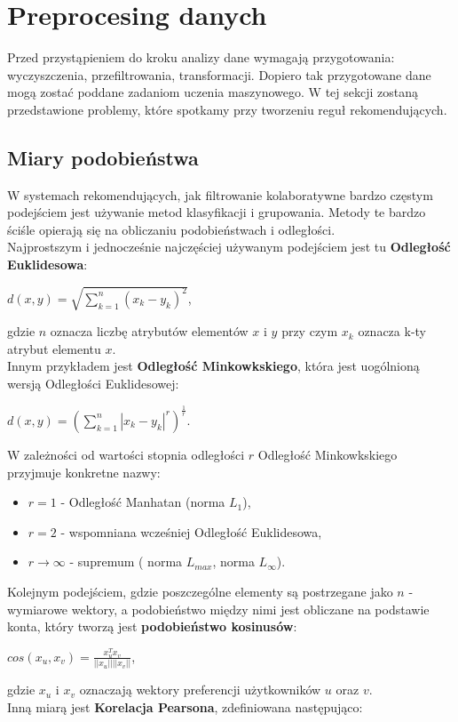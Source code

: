 \documentclass[12pt,a4paper]{report}
\begin{document}
\section{Preprocesing danych}
Przed przystąpieniem do kroku analizy dane wymagają przygotowania: wyczyszczenia, przefiltrowania, transformacji. Dopiero tak przygotowane dane mogą zostać poddane zadaniom uczenia maszynowego. W tej sekcji zostaną przedstawione problemy, które spotkamy przy tworzeniu reguł rekomendujących.
\subsection{Miary podobieństwa}
W systemach rekomendujących, jak filtrowanie kolaboratywne bardzo częstym podejściem jest używanie metod klasyfikacji i grupowania. Metody te bardzo ściśle opierają się na obliczaniu podobieństwach i odległości.
\\Najprostszym i jednocześnie najczęściej używanym podejściem jest tu \textbf{Odległość Euklidesowa}:
\begin{center}
$d(x,y) = \sqrt{\sum_{k=1}^n (x_k-y_k)^2}$, 
\end{center}
gdzie $n$ oznacza liczbę atrybutów elementów $x$ i $y$ przy czym $x_k$ oznacza k-ty atrybut elementu $x$. 
\\Innym przykładem jest \textbf{Odległość Minkowkskiego}, która jest uogólnioną wersją Odległości Euklidesowej:
\begin{center}
$d(x,y) = (\sum_{k=1}^n|x_k-y_k|^r)^{\frac{1}{r}}$.
\end{center}
W zależności od wartości stopnia odległości $r$ Odległość Minkowkskiego przyjmuje konkretne nazwy:
\begin{itemize}
\item $r=1$ - Odległość Manhatan (norma $L_1$),
\item $r=2$ - wspomniana wcześniej Odległość Euklidesowa,
\item $r \longrightarrow \infty $ - supremum ( norma $L_{max}$, norma $L_{\infty}$). 
\end{itemize}
Kolejnym podejściem, gdzie poszczególne elementy są postrzegane jako $n$ - wymiarowe wektory, a podobieństwo między nimi jest obliczane na podstawie konta, który tworzą jest \textbf{podobieństwo kosinusów}:
\begin{center}
$cos(x_u, x_v) = \frac{x_u^{T}x_v}{||x_u|| ||x_v||}$,
\end{center}
gdzie $x_u$ i $x_v$ oznaczają wektory preferencji użytkowników $u$ oraz $v$.
\\Inną miarą jest \textbf{Korelacja Pearsona}, zdefiniowana następująco:
\end{document}
